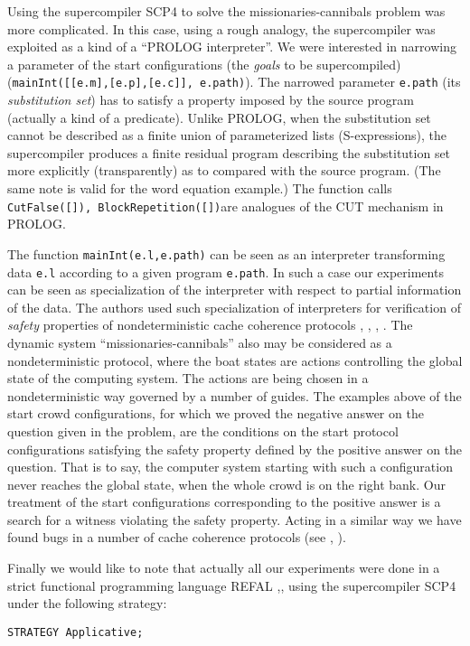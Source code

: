 \documentclass[preprint]{sigplanconf}
\begin{document}
Using the supercompiler SCP4 to solve the missionaries-can\-ni\-bals problem was more complicated. In this case, using a rough analogy, the supercompiler was exploited as a kind of a ``PROLOG interpreter''. We were interested in narrowing a parameter of the start configurations (the \emph{goals} to be supercompiled) (\texttt{mainInt([[e.m],[e.p],[e.c]], e.path)}). The narrowed parameter \texttt{e.path} (its \emph{substitution set}) has to satisfy a property imposed by the source program (actually a kind of a predicate). Unlike PROLOG, when the substitution set cannot be described as a finite union of parameterized lists (S-expressions), the supercompiler produces a finite residual program describing the substitution set more explicitly (transparently) as to compared with the source program. (The same note is valid for the word equation example.)  The function calls \texttt{CutFalse([]), BlockRepetition([])}are analogues of the CUT mechanism in PROLOG. 

The function \texttt{mainInt(e.l,e.path)} can be seen as an interpreter transforming data \texttt{e.l} according to a given program \texttt{e.path}. In such a case our experiments can be seen as specialization of the interpreter with respect to partial information of the data. The authors used such specialization of interpreters for verification of \emph{safety} properties of nondeterministic cache coherence protocols \cite{Lis_Nem:Programming}, \cite{Lis_Nem:IJFCS08}, \cite{Lis_Nem:CSR07}, \cite{Lis_Nem:Protocols07}. The dynamic system ``missionaries-cannibals'' also may be considered as a nondeterministic protocol, where the boat states are actions controlling the global state of the computing system. The actions are being chosen in a nondeterministic way governed by a number of guides. The examples above of the start crowd configurations, for which we proved the negative answer on the question given in the problem, are the conditions on the start protocol configurations satisfying the safety property defined by the positive answer on the question. That is to say, the computer system starting with such a configuration never reaches the global state, when the whole crowd is on the right bank. Our treatment of the start configurations corresponding to the positive answer is a search for a witness violating the safety property. Acting in a similar way we have found bugs in a number of cache coherence protocols (see \cite{Lis_Nem:TAP08}, \cite{Lis_Nem:Protocols07}).

{Finally we would like to note that actually all our experiments were done in a strict functional programming language REFAL \cite{Turchin:Refal5},\cite{Refal5:PZ}, using the supercompiler SCP4 under the following strategy:
\noindent
\begin{verbatim}
STRATEGY Applicative;
\end{verbatim}
}
\end{document}
